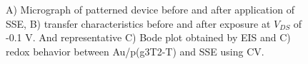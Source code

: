 \begin{figure}[ht]
    \centering
    \hspace{2em}
    \qquad
    \caption[Performance of solid-OECT with photolithographed SSE]{A) Micrograph of patterned device before and after application of SSE, B) transfer characteristics before and after exposure at $V_{DS}$ of -0.1 V. And representative C) Bode plot obtained by EIS and C) redox behavior between Au/p(g3T2-T) and SSE using CV.}
    \label{fig:photoSSE}
\end{figure}

